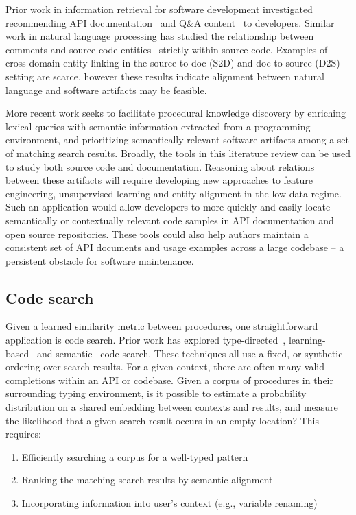 \documentclass[12pt]{article}
\begin{document}
Prior work in information retrieval for software development investigated recommending API documentation~\cite{robillard2015recommending} and Q\&A content~\cite{treude2016augmenting} to developers. Similar work in natural language processing has studied the relationship between comments and source code entities~\cite{iyer2018mapping, panthaplackel2020associating} strictly within source code. Examples of cross-domain entity linking in the source-to-doc (S2D) and doc-to-source (D2S) setting are scarce, however these results indicate alignment between natural language and software artifacts may be feasible.

More recent work seeks to facilitate procedural knowledge discovery by enriching lexical queries with semantic information extracted from a programming environment, and prioritizing semantically relevant software artifacts among a set of matching search results. Broadly, the tools in this literature review can be used to study both source code and documentation. Reasoning about relations between these artifacts will require developing new approaches to feature engineering, unsupervised learning and entity alignment in the low-data regime. Such an application would allow developers to more quickly and easily locate semantically or contextually relevant code samples in API documentation and open source repositories. These tools could also help authors maintain a consistent set of API documents and usage examples across a large codebase -- a persistent obstacle for software maintenance.

\subsection{Code search}\label{subsec:code-search}

Given a learned similarity metric between procedures, one straightforward application is code search. Prior work has explored type-directed~\cite{james2020digging}, learning-based~\cite{gu2018deep} and semantic~\cite{premtoon2020semantic} code search. These techniques all use a fixed, or synthetic ordering over search results. For a given context, there are often many valid completions within an API or codebase. Given a corpus of procedures in their surrounding typing environment, is it possible to estimate a probability distribution on a shared embedding between contexts and results, and measure the likelihood that a given search result occurs in an empty location? This requires:

  \begin{enumerate}
    \item Efficiently searching a corpus for a well-typed pattern
    \item Ranking the matching search results by semantic alignment
    \item Incorporating information into user's context (e.g., variable renaming)
  \end{enumerate}
\end{document}
